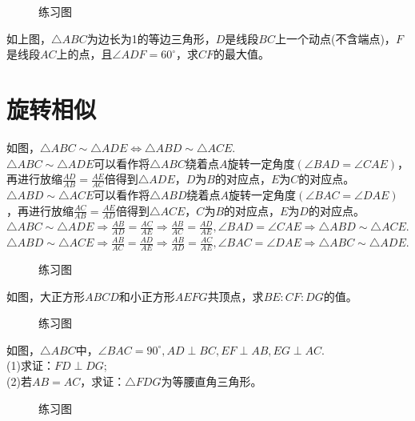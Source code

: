 \begin{figure}[H]
    \centering
    \resizebox{4cm}{!}{}
    \caption{练习图}
\end{figure}
\begin{problem}
如上图，$\triangle ABC$为边长为1的等边三角形，$D$是线段$BC$上一个动点(不含端点)，$F$是线段$AC$上的点，且$\angle ADF=60^\circ$，求$CF$的最大值。
\end{problem}
\clearpage
\section{旋转相似}
\begin{definition}
    如图，$\triangle ABC\sim \triangle ADE \Leftrightarrow \triangle ABD \sim \triangle ACE$. \\
    $\triangle ABC\sim \triangle ADE$可以看作将$\triangle ABC$绕着点$A$旋转一定角度$(\angle BAD=\angle CAE)$，再进行放缩$\frac{AD}{AB}=\frac{AE}{AC}$倍得到$\triangle ADE$，$D$为$B$的对应点，$E$为$C$的对应点。\\
    $\triangle ABD\sim \triangle ACE$可以看作将$\triangle ABD$绕着点$A$旋转一定角度$(\angle BAC=\angle DAE)$，再进行放缩$\frac{AC}{AB}=\frac{AE}{AD}$倍得到$\triangle ACE$，$C$为$B$的对应点，$E$为$D$的对应点。\\
    $\triangle ABC\sim \triangle ADE \Rightarrow \frac{AB}{AD}=\frac{AC}{AE} \Rightarrow \frac{AB}{AC}=\frac{AD}{AE},\angle BAD=\angle CAE \Rightarrow \triangle ABD \sim \triangle ACE.$ \\
    $\triangle ABD\sim \triangle ACE \Rightarrow \frac{AB}{AC}=\frac{AD}{AE} \Rightarrow \frac{AB}{AD}=\frac{AC}{AE},\angle BAC=\angle DAE \Rightarrow \triangle ABC \sim \triangle ADE.$
\end{definition}
\begin{figure}[H]
    \centering
    \resizebox{4cm}{!}{}
    \caption{练习图}
\end{figure}
\begin{problem}
如图，大正方形$ABCD$和小正方形$AEFG$共顶点，求$BE:CF:DG$的值。
\end{problem}
\begin{figure}[H]
    \centering
    \resizebox{3cm}{!}{}
    \caption{练习图}
\end{figure}
\begin{problem}
如图，$\triangle ABC$中，$\angle BAC=90^\circ,AD\perp BC,EF\perp AB,EG\perp AC$. \\
(1)求证：$FD\perp DG$; \\
(2)若$AB=AC$，求证：$\triangle FDG$为等腰直角三角形。
\end{problem}
\begin{figure}[H]
    \centering
    \resizebox{4cm}{!}{}
    \caption{练习图}
\end{figure}
\clearpage
